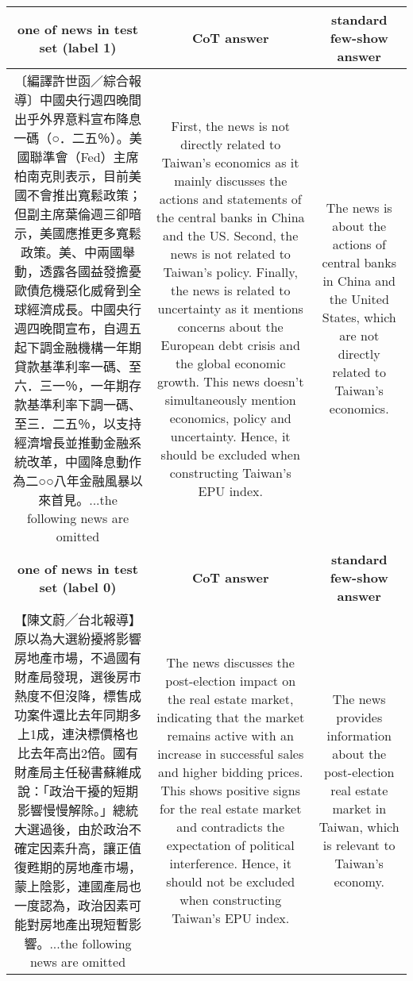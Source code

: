 {
\def\sym#1{\ifmmode^{#1}\else\(^{#1}\)\fi}
\begin{tabularx}{\textwidth}{|C|C|C|}
\hline

\textbf{one of news in test set (label 1)} & 
\textbf{CoT answer} & 
\textbf{standard few-show answer}\\
\hline
〔編譯許世函／綜合報導〕中國央行週四晚間出乎外界意料宣布降息一碼（○．二五％）。美國聯準會（Fed）主席柏南克則表示，目前美國不會推出寬鬆政策；但副主席葉倫週三卻暗示，美國應推更多寬鬆政策。美、中兩國舉動，透露各國益發擔憂歐債危機惡化威脅到全球經濟成長。中國央行週四晚間宣布，自週五起下調金融機構一年期貸款基準利率一碼、至六．三一％，一年期存款基準利率下調一碼、至三．二五％，以支持經濟增長並推動金融系統改革，中國降息動作為二○○八年金融風暴以來首見。...the following news are omitted
&
First, the news is not directly related to Taiwan's economics as it mainly discusses the actions and statements of the central banks in China and the US. Second, the news is not related to Taiwan's policy. Finally, the news is related to uncertainty as it mentions concerns about the European debt crisis and the global economic growth. This news doesn't simultaneously mention economics, policy and uncertainty. Hence, it should be excluded when constructing Taiwan's EPU index.
&
The news is about the actions of central banks in China and the United States, which are not directly related to Taiwan's economics.
\\
\hline

\textbf{one of news in test set (label 0)} & 
\textbf{CoT answer} & 
\textbf{standard few-show answer}\\
\hline

【陳文蔚╱台北報導】原以為大選紛擾將影響房地產市場，不過國有財產局發現，選後房市熱度不但沒降，標售成功案件還比去年同期多上1成，連決標價格也比去年高出2倍。國有財產局主任秘書蘇維成說：「政治干擾的短期影響慢慢解除。」總統大選過後，由於政治不確定因素升高，讓正值復甦期的房地產市場，蒙上陰影，連國產局也一度認為，政治因素可能對房地產出現短暫影響。...the following news are omitted
&
The news discusses the post-election impact on the real estate market, indicating that the market remains active with an increase in successful sales and higher bidding prices. This shows positive signs for the real estate market and contradicts the expectation of political interference. Hence, it should not be excluded when constructing Taiwan's EPU index.
&
The news provides information about the post-election real estate market in Taiwan, which is relevant to Taiwan's economy.
\\
\hline
\end{tabularx}
}